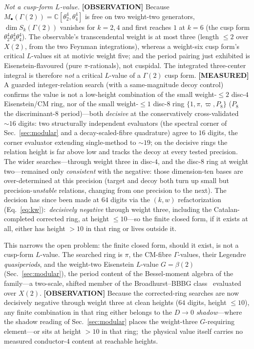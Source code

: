 \documentclass[aps,pra,twocolumn,superscriptaddress,longbibliography]{revtex4-2}
\begin{document}
\emph{Not a cusp-form $L$-value.}  \textbf{[OBSERVATION]} Because
$M_{\bullet}(\Gamma(2))=\mathbb{C}[\theta_{2}^{4},\theta_{4}^{4}]$ is free on two
weight-two generators, $\dim S_{k}(\Gamma(2))$ vanishes for $k=2,4$ and first
reaches $1$ at $k=6$ (the cusp form $\theta_{2}^{4}\theta_{3}^{4}\theta_{4}^{4}$).
The observable's transcendental weight is at most three (length $\le2$ over
$X(2)$, from the two Feynman integrations), whereas a weight-six cusp form's
critical $L$-values sit at motivic weight five; and the period pairing just
exhibited is Eisenstein-flavoured (pure $\pi$-rationals), not cuspidal.  The
integrated three-center integral is therefore \emph{not} a critical $L$-value of
a $\Gamma(2)$ cusp form.  \textbf{[MEASURED]} A guarded integer-relation
search (with a same-magnitude decoy control) confirms the value is not a
low-height combination of the small weight-$\le2$ disc-$4$ Eisenstein/CM ring,
nor of the small weight-$\le1$ disc-$8$ ring $\{1,\pi,\varpi,P_{8}\}$ ($P_{8}$
the discriminant-$8$ period)---both \emph{decisive} at the conservatively
cross-validated $\sim\!16$ digits: two structurally independent evaluators (the
spectral corner of Sec.~\ref{sec:modular} and a decay-scaled-fibre quadrature)
agree to $16$ digits, the corner evaluator extending single-method to
$\sim\!19$; on the decisive rings the relation height is far above low and tracks
the decoy at every tested precision.  The wider searches---through weight three
in disc-$4$, and the disc-$8$ ring at weight two---remained only \emph{consistent}
with the negative: those dimension-ten bases are over-determined at this
precision (target and decoy both turn up small but precision-\emph{unstable}
relations, changing from one precision to the next).  The decision has since
been made at $64$ digits via the $(k,w)$ refactorization
(Eq.~\eqref{eq:kw}):\ \emph{decisively negative} through weight three,
including the Catalan-completed corrected ring, at height $\le10$---so the
finite closed form, if it exists at all, either has height $>10$ in that ring
or lives outside it.

This narrows the open problem: the finite closed form, should it exist, is
not a cusp-form $L$-value.  The searched ring is
$\pi$, the CM-fibre $\Gamma$-values, their Legendre \emph{quasiperiods}, and the
weight-two Eisenstein $L$-value $G=\beta(2)$ (Sec.~\ref{sec:modular}), the
period content of the Bessel-moment algebra of the family---a two-scale, shifted
member of the Broadhurst--BBBG class~\cite{bbbg2008,broadhurst2008} evaluated
over $X(2)$.  \textbf{[OBSERVATION]} Because the corrected-ring searches are now decisively negative
through weight three at clean heights ($64$ digits, height $\le10$), any finite
combination in that ring either belongs to the $D\to0$ \emph{shadow}---where the shadow reading of Sec.~\ref{sec:modular} places the
weight-three $G$-requiring element---or sits at height $>10$ in that ring;\ the physical
value itself carries no measured conductor-$4$ content at reachable heights.
\end{document}
